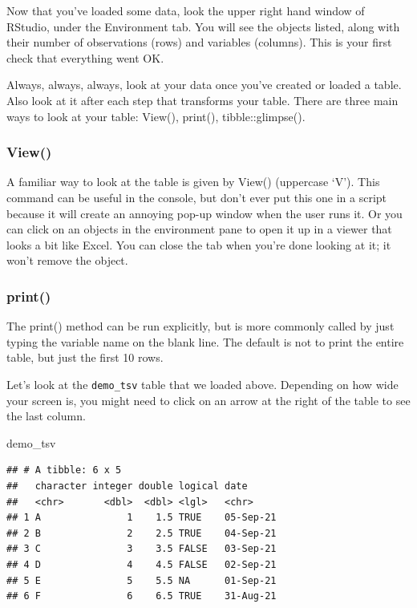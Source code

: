 \documentclass[
  oneside]{book}
\newenvironment{Shaded}{\begin{snugshade}}{\end{snugshade}}
\newcommand{\NormalTok}[1]{#1}
\begin{document}
Now that you've loaded some data, look the upper right hand window of RStudio, under the Environment tab. You will see the objects listed, along with their number of observations (rows) and variables (columns). This is your first check that everything went OK.

Always, always, always, look at your data once you've created or loaded a table. Also look at it after each step that transforms your table. There are three main ways to look at your table: {View}{(}{)}, {print}{(}{)}, {tibble}{::}{glimpse}{(}{)}.

\hypertarget{view}{%
\subsubsection{View()}\label{view}}

A familiar way to look at the table is given by {View}{(}{)} (uppercase `V'). This command can be useful in the console, but don't ever put this one in a script because it will create an annoying pop-up window when the user runs it. Or you can click on an objects in the environment pane to open it up in a viewer that looks a bit like Excel. You can close the tab when you're done looking at it; it won't remove the object.

\hypertarget{print}{%
\subsubsection{print()}\label{print}}

The {print}{(}{)} method can be run explicitly, but is more commonly called by just typing the variable name on the blank line. The default is not to print the entire table, but just the first 10 rows.

Let's look at the \texttt{demo\_tsv} table that we loaded above. Depending on how wide your screen is, you might need to click on an arrow at the right of the table to see the last column.

\begin{Shaded}
\begin{Highlighting}[]
\NormalTok{demo\_tsv}
\end{Highlighting}
\end{Shaded}

\begin{verbatim}
## # A tibble: 6 x 5
##   character integer double logical date     
##   <chr>       <dbl>  <dbl> <lgl>   <chr>    
## 1 A               1    1.5 TRUE    05-Sep-21
## 2 B               2    2.5 TRUE    04-Sep-21
## 3 C               3    3.5 FALSE   03-Sep-21
## 4 D               4    4.5 FALSE   02-Sep-21
## 5 E               5    5.5 NA      01-Sep-21
## 6 F               6    6.5 TRUE    31-Aug-21
\end{verbatim}
\end{document}
